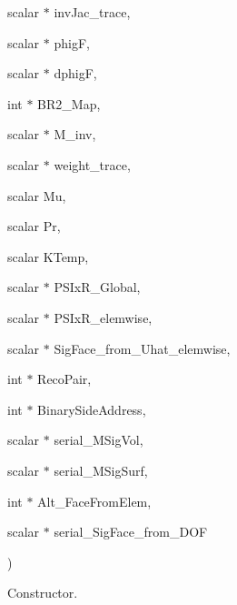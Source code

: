 {\begin{DoxyParamCaption}
\item[{scalar $\ast$}]{inv\-Jac\-\_\-trace, }
\item[{scalar $\ast$}]{phig\-F, }
\item[{scalar $\ast$}]{dphig\-F, }
\item[{int $\ast$}]{B\-R2\-\_\-\-Map, }
\item[{scalar $\ast$}]{M\-\_\-inv, }
\item[{scalar $\ast$}]{weight\-\_\-trace, }
\item[{scalar}]{Mu, }
\item[{scalar}]{Pr, }
\item[{scalar}]{K\-Temp, }
\item[{scalar $\ast$}]{P\-S\-Ix\-R\-\_\-\-Global, }
\item[{scalar $\ast$}]{P\-S\-Ix\-R\-\_\-elemwise, }
\item[{scalar $\ast$}]{Sig\-Face\-\_\-from\-\_\-\-Uhat\-\_\-elemwise, }
\item[{int $\ast$}]{Reco\-Pair, }
\item[{int $\ast$}]{Binary\-Side\-Address, }
\item[{scalar $\ast$}]{serial\-\_\-\-M\-Sig\-Vol, }
\item[{scalar $\ast$}]{serial\-\_\-\-M\-Sig\-Surf, }
\item[{int $\ast$}]{Alt\-\_\-\-Face\-From\-Elem, }
\item[{scalar $\ast$}]{serial\-\_\-\-Sig\-Face\-\_\-from\-\_\-\-D\-O\-F}
\end{DoxyParamCaption}
)\hspace{0.3cm}{\ttfamily [inline]}}\label{classDG__SOLVER_a6e2362ea25dcb7cae7104768fbaff22a}


Constructor. 


